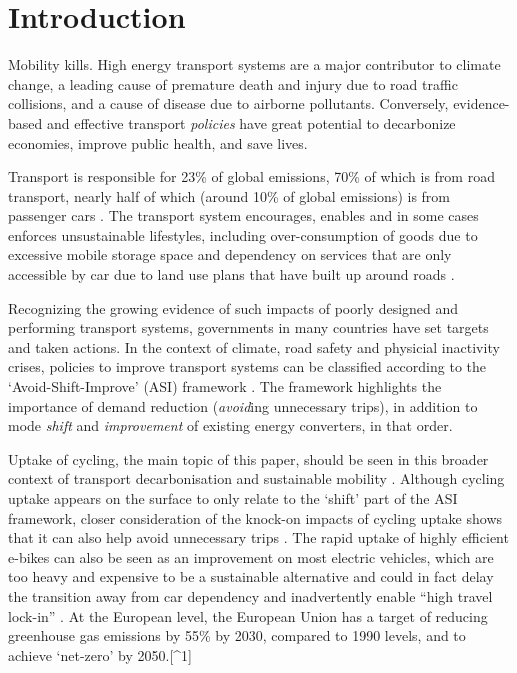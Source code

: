 \documentclass[
  super,
  preprint,
  3p]{elsarticle}
\begin{document}
    \ifdefined\Shaded\renewenvironment{Shaded}{\begin{tcolorbox}[boxrule=0pt, borderline west={3pt}{0pt}{shadecolor}, interior hidden, breakable, frame hidden, sharp corners, enhanced]}{\end{tcolorbox}}\fi

\newpage{}

\hypertarget{introduction}{%
\section{Introduction}\label{introduction}}

Mobility kills. High energy transport systems are a major contributor to
climate change, a leading cause of premature death and injury due to
road traffic collisions, and a cause of disease due to airborne
pollutants. Conversely, evidence-based and effective transport
\emph{policies} have great potential to decarbonize economies, improve
public health, and save lives.

Transport is responsible for 23\% of global emissions, 70\% of which is
from road transport, nearly half of which (around 10\% of global
emissions) is from passenger cars \citep{jaramillo2022}. The transport
system encourages, enables and in some cases enforces unsustainable
lifestyles, including over-consumption of goods due to excessive mobile
storage space and dependency on services that are only accessible by car
due to land use plans that have built up around roads
\citep{gray2001, shergold2012, motte-baumvol2010}.

Recognizing the growing evidence of such impacts of poorly designed and
performing transport systems, governments in many countries have set
targets and taken actions. In the context of climate, road safety and
physicial inactivity crises, policies to improve transport systems can
be classified according to the `Avoid-Shift-Improve' (ASI) framework
\citep{jaramillo2022}. The framework highlights the importance of demand
reduction (\emph{avoid}ing unnecessary trips), in addition to mode
\emph{shift} and \emph{improvement} of existing energy converters, in
that order.

Uptake of cycling, the main topic of this paper, should be seen in this
broader context of transport decarbonisation \citep{brand2020} and
sustainable mobility \citep{burns2013}. Although cycling uptake appears
on the surface to only relate to the `shift' part of the ASI framework,
closer consideration of the knock-on impacts of cycling uptake shows
that it can also help avoid unnecessary trips \citep{nello-deakin2020}.
The rapid uptake of highly efficient e-bikes can also be seen as an
improvement on most electric vehicles, which are too heavy and expensive
to be a sustainable alternative and could in fact delay the transition
away from car dependency and inadvertently enable ``high travel
lock-in'' \citep{anable2019}. At the European level, the European Union
has a target of reducing greenhouse gas emissions by 55\% by 2030,
compared to 1990 levels, and to achieve `net-zero' by 2050.{[}\^{}1{]}
\end{document}
